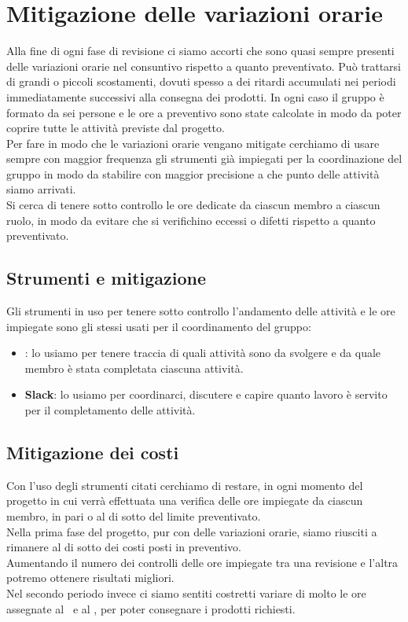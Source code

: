 \newpage

\section{Mitigazione delle variazioni orarie}	\label{mitigazione variazioni}
Alla fine di ogni fase di revisione ci siamo accorti che sono quasi sempre presenti delle variazioni orarie nel consuntivo rispetto a quanto preventivato.
Può trattarsi di grandi o piccoli scostamenti, dovuti spesso a dei ritardi accumulati nei periodi immediatamente successivi alla consegna dei prodotti. In ogni caso il gruppo è formato da sei persone e le ore a preventivo sono state calcolate in modo da poter coprire tutte le attività previste dal progetto.\\
Per fare in modo che le variazioni orarie vengano mitigate cerchiamo di usare sempre con maggior frequenza gli strumenti già impiegati per la coordinazione del gruppo in modo da stabilire con maggior precisione a che punto delle attività siamo arrivati.\\
Si cerca di tenere sotto controllo le ore dedicate da ciascun membro a ciascun ruolo, in modo da evitare che si verifichino eccessi o difetti rispetto a quanto preventivato.

    \subsection{Strumenti e mitigazione}
	Gli strumenti in uso per tenere sotto controllo l'andamento delle attività e le ore impiegate sono gli stessi usati per il coordinamento del gruppo:
	\begin{itemize}
	    \item \textbf{}: lo usiamo per tenere traccia di quali attività sono da svolgere e da quale membro è stata completata ciascuna attività.
	    \item \textbf{Slack}: lo usiamo per coordinarci, discutere e capire quanto lavoro è servito per il completamento delle attività.
	\end{itemize}
	
	\subsection{Mitigazione dei costi}
	Con l'uso degli strumenti citati cerchiamo di restare, in ogni momento del progetto in cui verrà effettuata una verifica delle ore impiegate da ciascun membro, in pari o al di sotto del limite preventivato.\\
	Nella prima fase del progetto, pur con delle variazioni orarie, siamo riusciti a rimanere al di sotto dei costi posti in preventivo.\\
	Aumentando il numero dei controlli delle ore impiegate tra una revisione e l'altra potremo ottenere risultati migliori.\\
    Nel secondo periodo invece ci siamo sentiti costretti variare di molto le ore assegnate al \Progr\ e al \Prog, per poter consegnare i prodotti richiesti.

